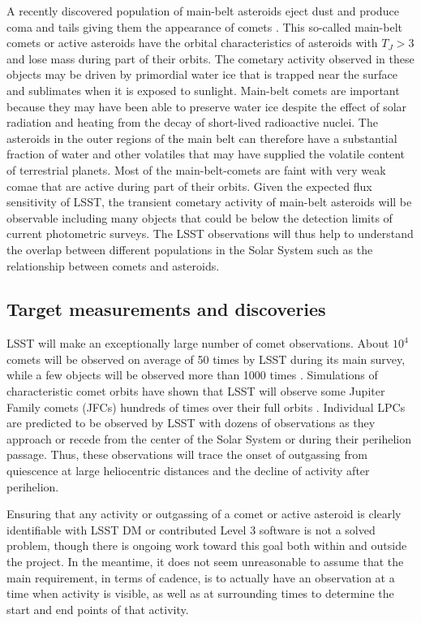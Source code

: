 A recently discovered population of main-belt asteroids eject
dust and produce coma and tails giving them the appearance of
comets \citep{2012AJ....143...66J}.  This so-called main-belt
comets or active asteroids have the orbital characteristics of
asteroids with $T_J > 3$ and lose mass during part of their
orbits. The cometary activity observed in these objects may be
driven by primordial water ice that is trapped near the
surface and sublimates when it is exposed to sunlight.
Main-belt comets are important because they may have been able to
preserve water ice despite the effect of solar radiation and
heating from the decay of short-lived radioactive nuclei.  The
asteroids in the outer regions of the main belt can therefore
have a substantial fraction of water and other volatiles that
may have supplied the volatile content of terrestrial planets.
Most of the main-belt-comets are faint with very weak comae
that are active during part of their orbits. Given the
expected flux sensitivity of LSST, the transient cometary
activity of main-belt asteroids will be observable including
many objects that could be below the detection limits of
current photometric surveys.  The LSST observations will thus
help to understand the overlap between different populations
in the Solar System such as the relationship between comets
and asteroids.


\subsection{Target measurements and discoveries}
\label{sec:\secname:targets}

LSST will make an exceptionally large number of comet
observations.  About $10^4$ comets will be observed on average
of 50 times by LSST during its main survey, while a few objects
will be observed more than 1000 times
\citep{2010PhDT.......241S}.  Simulations of characteristic
comet orbits have shown that LSST will observe some Jupiter
Family comets (JFCs) hundreds of times over their full orbits
\citep{2010PhDT.......241S}.  Individual LPCs are predicted to
be observed by LSST with dozens of observations as they
approach or recede from the center of the Solar System or
during their perihelion passage.  Thus, these observations
will trace the onset of outgassing from quiescence at large
heliocentric distances and the decline of activity after
perihelion.

Ensuring that any activity or outgassing of a comet or active asteroid
is clearly identifiable with LSST DM or contributed Level 3 software is not a
solved problem, though there is ongoing work toward this goal
both within and outside the project.
In the meantime, it does not seem unreasonable
to assume that the main requirement, in terms of cadence, is to actually
have an observation at a time when activity is visible, as well as at
surrounding times to determine the start and end points of that activity.

